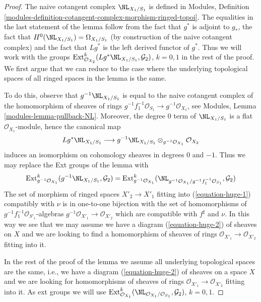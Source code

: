\begin{proof}
The naive cotangent complex $\NL_{X_1/S_1}$ is defined in Modules, Definition
\ref{modules-definition-cotangent-complex-morphism-ringed-topoi}.
The equalities in the last statement of the lemma follow from
the fact that $g^*$ is adjoint to $g_*$, the fact that
$H^0(\NL_{X_1/S_1}) = \Omega_{X_1/S_1}$ (by construction of the
naive cotangent complex) and the fact that $Lg^*$ is the left
derived functor of $g^*$. Thus we will work with the groups
$\text{Ext}^k_{\mathcal{O}_{X_2}}(Lg^*\NL_{X_1/S_1}, \mathcal{G}_2)$,
$k = 0, 1$ in the rest of the proof. We first argue that we can reduce
to the case where the underlying topological spaces of all ringed
spaces in the lemma is the same.

\medskip\noindent
To do this, observe that $g^{-1}\NL_{X_1/S_1}$ is equal to the naive
cotangent complex of the homomorphism of sheaves of rings
$g^{-1}f_1^{-1}\mathcal{O}_{S_1} \to g^{-1}\mathcal{O}_{X_1}$, see
Modules, Lemma \ref{modules-lemma-pullback-NL}.
Moreover, the degree $0$ term of $\NL_{X_1/S_1}$ is a flat
$\mathcal{O}_{X_1}$-module, hence the canonical map
$$
Lg^*\NL_{X_1/S_1}
\longrightarrow
g^{-1}\NL_{X_1/S_1} \otimes_{g^{-1}\mathcal{O}_{X_1}} \mathcal{O}_{X_2}
$$
induces an isomorphism on cohomology sheaves in degrees $0$ and $-1$.
Thus we may replace the Ext groups of the lemma with
$$
\text{Ext}^k_{g^{-1}\mathcal{O}_{X_1}}(g^{-1}\NL_{X_1/S_1}, \mathcal{G}_2) =
\text{Ext}^k_{g^{-1}\mathcal{O}_{X_1}}(
\NL_{g^{-1}\mathcal{O}_{X_1}/g^{-1}f_1^{-1}\mathcal{O}_{S_1}}, \mathcal{G}_2)
$$
The set of morphism of ringed spaces $X'_2 \to X'_1$ fitting into
(\ref{equation-huge-1}) compatibly with $\nu$
is in one-to-one bijection with
the set of homomorphisms of $g^{-1}f_1^{-1}\mathcal{O}_{S'_1}$-algebras
$g^{-1}\mathcal{O}_{X'_1} \to \mathcal{O}_{X'_2}$ which are compatible with
$f^\sharp$ and $\nu$. In this way we see that we may assume we have a
diagram (\ref{equation-huge-2}) of sheaves on $X$ and we are looking to
find a homomorphism of sheaves of rings
$\mathcal{O}_{X'_1} \to \mathcal{O}_{X'_2}$ fitting into it.

\medskip\noindent
In the rest of the proof of the lemma we assume
all underlying topological spaces are the
same, i.e., we have a diagram (\ref{equation-huge-2}) of sheaves on
a space $X$ and we are looking for homomorphisms of sheaves of rings
$\mathcal{O}_{X'_1} \to \mathcal{O}_{X'_2}$ fitting into it.
As ext groups we will use
$\text{Ext}^k_{\mathcal{O}_{X_1}}(
\NL_{\mathcal{O}_{X_1}/\mathcal{O}_{S_1}}, \mathcal{G}_2)$, $k = 0, 1$.


\end{proof}
